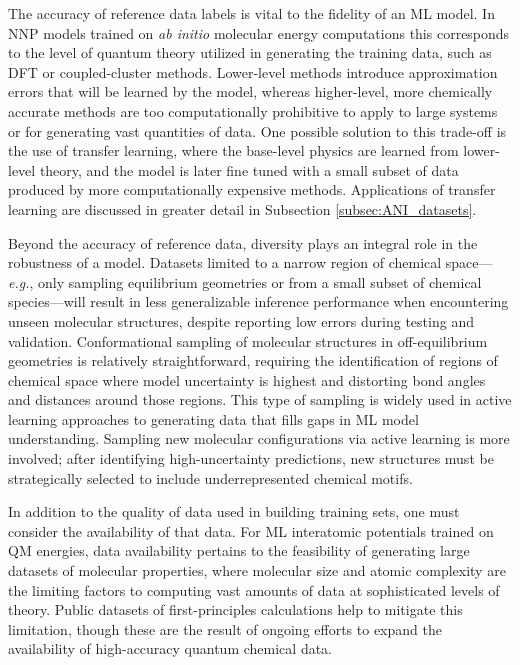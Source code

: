 The accuracy of reference data labels is vital to the fidelity of an ML model. 
In NNP models trained on \textit{ab initio} molecular energy computations this corresponds to the level of quantum theory utilized in generating the training data, such as DFT \cite{dft_first_paper} or coupled-cluster \cite{coupled_cluster_first_paper} methods.
Lower-level methods introduce approximation errors that will be learned by the model, whereas higher-level, more chemically accurate methods are too computationally prohibitive to apply to large systems or for generating vast quantities of data.
One possible solution to this trade-off is the use of transfer learning, where the base-level physics are learned from lower-level theory, and the model is later fine tuned with a small subset of data produced by more computationally expensive methods.
Applications of transfer learning are discussed in greater detail in Subsection \ref{subsec:ANI_datasets}.

Beyond the accuracy of reference data, diversity plays an integral role in the robustness of a model.
Datasets limited to a narrow region of chemical space---\textit{e.g.}, only sampling equilibrium geometries or from a small subset of chemical species---will result in less generalizable inference performance when encountering unseen molecular structures, despite reporting low errors during testing and validation.
Conformational sampling of molecular structures in off-equilibrium geometries is relatively straightforward, requiring the identification of regions of chemical space where model uncertainty is highest and distorting bond angles and distances around those regions.
This type of sampling is widely used in active learning approaches to generating data that fills gaps in ML model understanding.
Sampling new molecular configurations via active learning is more involved; after identifying high-uncertainty predictions, new structures must be strategically selected to include underrepresented chemical motifs.

In addition to the quality of data used in building training sets, one must consider the availability of that data.
For ML interatomic potentials trained on QM energies, data availability pertains to the feasibility of generating large datasets of molecular properties, where molecular size and atomic complexity are the limiting factors to computing vast amounts of data at sophisticated levels of theory.
Public datasets of first-principles calculations \cite{qm9, qm40} help to mitigate this limitation, though these are the result of ongoing efforts to expand the availability of high-accuracy quantum chemical data.

